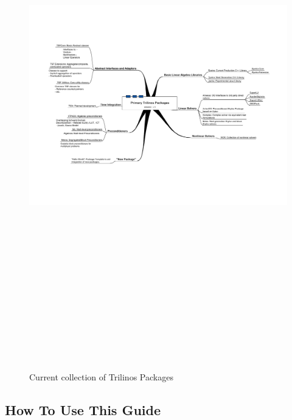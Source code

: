 \documentclass[12pt,strict]{TrilinosDevGuide}
\begin{document}
\begin{figure}
\begin{center}
\includegraphics[height=9in]{TrilinosPackagesDiagram}
\end{center}
\label{Figure:TrilinosPackages}
\caption{Current collection of Trilinos Packages}
\end{figure}

\subsection{How To Use This Guide}
\end{document}
